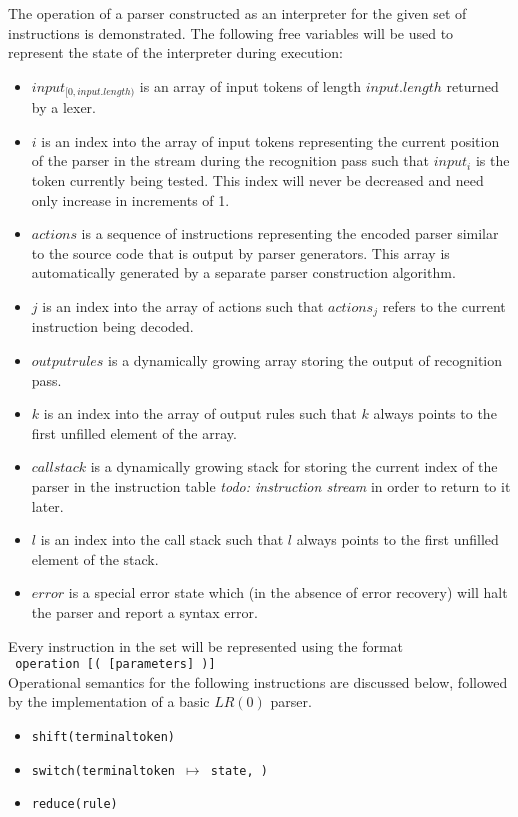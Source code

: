 \documentclass[a4paper,11pt]{article}
\begin{document}
The operation of a parser constructed as an interpreter for the given set of instructions is demonstrated.
The following free variables will be used to represent the state of the interpreter during execution:

\begin{itemize}
\item $input_{[0, input.length)}$ is an array of input tokens of length $input.length$ returned by a lexer.
\item $i$ is an index into the array of input tokens representing the current position of the parser in the stream during the recognition pass such that $input_i$ is the token currently being tested.
This index will never be decreased and need only increase in increments of 1.
\item $actions$ is a sequence of instructions representing the encoded parser similar to the source code that is output by parser generators. 
This array is automatically generated by a separate parser construction algorithm.
\item $j$ is an index into the array of actions such that $actions_j$ refers to the current instruction being decoded.
\item $outputrules$ is a dynamically growing array storing the output of recognition pass.
\item $k$ is an index into the array of output rules such that $k$ always points to the first unfilled element of the array.
\item $callstack$ is a dynamically growing stack for storing the current index of the parser in the instruction table \emph{todo: instruction stream} in order to return to it later.
\item $l$ is an index into the call stack such that $l$ always points to the first unfilled element of the stack.
\item $error$ is a special error state which (in the absence of error recovery) will halt the parser and report a syntax error.
\end{itemize}

Every instruction in the set will be represented using the format\\ \texttt{ operation [( [parameters\textellipsis] )]}\\

Operational semantics for the following instructions are discussed below, followed by the implementation of a basic $LR(0)$ parser.
\begin{itemize}
\item \texttt{shift(terminaltoken)}
\item \texttt{switch(terminaltoken $\mapsto$ state, \textellipsis)}
\item \texttt{reduce(rule)}
\end{itemize}
\end{document}

